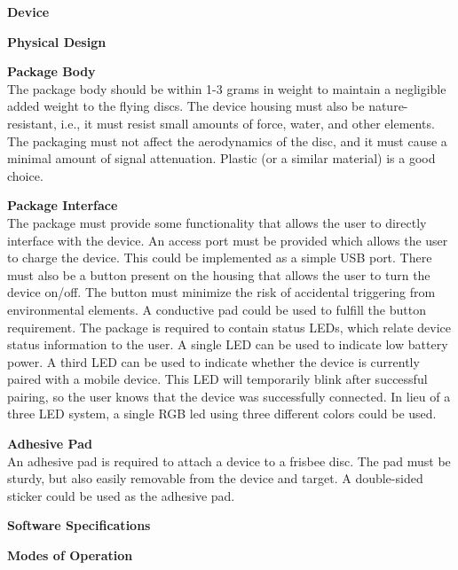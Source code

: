 \documentclass[12pt]{article}
\begin{document}
  \begin{packed_enum}
    \item \textbf{Device}
    \begin{packed_enum}
      \item \textbf{Physical Design}
      \begin{packed_enum}
        \item \textbf{Package Body} \\
        The package body should be within 1-3 grams in weight to maintain a negligible added weight to the 
        flying discs. The device housing must also be nature-resistant, i.e., it must resist small amounts of
        force, water, and other elements. The packaging must not affect the aerodynamics of the disc, and it
        must cause a minimal amount of signal attenuation. Plastic (or a similar material) is a good choice.
        \item \textbf{Package Interface} \\
        The package must provide some functionality that allows the user to directly interface with the device.
        An access port must be provided which allows the user to charge the device. This could be implemented 
        as a simple USB port. There must also be a button present on the housing that allows the user to turn
        the device on/off. The button must minimize the risk of accidental triggering from environmental
        elements. A conductive pad could be used to fulfill the button requirement. The package is required
        to contain status LEDs, which relate device status information to the user. A single LED can be used
        to indicate low battery power. A third LED can be used to indicate whether the device is currently
        paired with a mobile device. This LED will temporarily blink after successful pairing, so the user knows
        that the device was successfully connected. In lieu of a three LED system, a single RGB led using three
        different colors could be used.
        \item \textbf{Adhesive Pad} \\
        An adhesive pad is required to attach a device to a frisbee disc. The pad must be sturdy, but also
        easily removable from the device and target. A double-sided sticker could be used as the adhesive pad.
      \end{packed_enum}
      \item \textbf{Software Specifications}
      \begin{packed_enum}
        \item \textbf{Modes of Operation} \\

\end{packed_enum}
\end{packed_enum}
\end{packed_enum}
\end{document}
